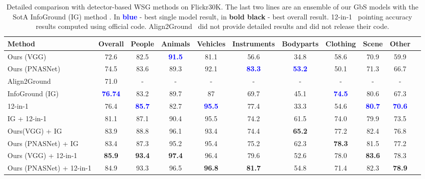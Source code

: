 \documentclass[10pt,twocolumn,letterpaper]{article}
\def\oursspace{{GbS }}
\newcommand\secvspace{\vspace{-0.0cm}}
\newcommand\figvspace{\vspace{-0.2cm}}
\begin{document}
 \begin{table*}[h]
\setlength\tabcolsep{5pt}
\begin{center}
\begin{tabular}{ l|| c |c c c c c c c c c }
Method & Overall &People & Animals & Vehicles & Instruments & Bodyparts & Clothing & Scene & Other \\
 \midrule
  Ours \small{(VGG)} & 72.6 & 82.5 & \textcolor{blue}{\textbf{91.5}} & 81.1 & 56.6 & 34.8 & 58.6 & 70.9 & 59.9 \\ 
  Ours \small{(PNASNet)} & 74.5 & 83.6 & 89.3 & 92.1 & \textcolor{blue}{\textbf{83.3}} & \textcolor{blue}{\textbf{53.2}} & 50.1 & 71.3 & 66.7 \\ 
  Align2Ground~\cite{datta2019align2ground}&71.0&-&-&-&-&-&-&-&-\\
  InfoGround (IG)~\cite{gupta2020contrastive} & \textcolor{blue}{\textbf{76.74}} & 83.2 & 89.7 & 87 & 69.7 & 45.1 & \textcolor{blue}{\textbf{74.5}} & 80.6 & 67.3 \\
  12\small{-in-}1~\cite{lu202012} & 76.4 & \textcolor{blue}{\textbf{85.7}} & 82.7 & \textcolor{blue}{\textbf{95.5}} & 77.4 & 33.3 & 54.6 & \textcolor{blue}{\textbf{80.7}} & \textcolor{blue}{\textbf{70.6}} \\
  \midrule
  \small{IG} + 12\small{-in-}1 &  81.1 & 87.1 & 90.4 & 95.5 & 74.2 & 61.5 & 74.0 & 79.9 & 73.5 \\
  Ours\small{(VGG)} + IG &  83.9 & 88.8 & 96.1 & 93.4 &74.4 & \textbf{65.2} & 77.2 & 82.4 & 76.8 \\
  Ours \small{(PNASNet)} + IG &  83.4 & 87.3 & 95.2 & 95.4 & 75.2 & 62.3 & \textbf{78.3} & 81.5 & 77.2 \\
  Ours \small{(VGG)} + 12\small{-in-}1 &  \textbf{85.9} & \textbf{93.4} & \textbf{97.4} &  96.4 & 79.6 & 52.6 & 78.0 & \textbf{83.6} & 78.3 \\
  Ours \small{(PNASNet)} + 12\small{-in-}1 &  84.9 & 93.3 & 96.5 & \textbf{96.8} & \textbf{81.7} & 54.8 & 71.4 & 82.3 & \textbf{78.9} \\
 
\end{tabular}
\end{center}
\caption{Detailed comparison with detector-based WSG methods \cite{datta2019align2ground, gupta2020contrastive} on Flickr30K. The last two lines are an ensemble of our \oursspace models with the SotA InfoGround (IG) method \cite{gupta2020contrastive}. In \textcolor{blue}{\textbf{blue}} - best single model result, in \textbf{bold black} - best overall result. 12\small{-in-}1~\cite{lu202012} pointing accuracy results computed using official code. Align2Ground~\cite{datta2019align2ground} did not provide detailed results and did not release their code.}
\figvspace
\label{tab:detector_detailed_results}
\end{table*} %
 \secvspace
\end{document}

